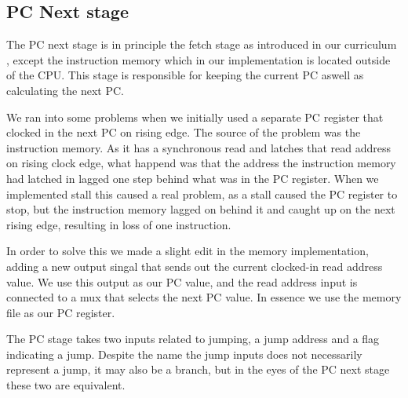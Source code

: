\subsection{PC Next stage}
The PC next stage is in principle the fetch stage as introduced in our curriculum 
\cite{curriculum}, except the instruction memory which in our implementation is located
outside of the CPU. This stage is responsible for keeping the current PC aswell as 
calculating the next PC.

We ran into some problems when we initially used a separate PC register that clocked 
in the next PC on rising edge. The source of the problem was the instruction memory.
As it has a synchronous read and latches that read address on rising clock edge,
what happend was that the address the instruction memory had latched in lagged one step
behind what was in the PC register. When we implemented
stall this caused a real problem, as a stall caused the PC register to stop, but the
instruction memory lagged on behind it and caught up on the next rising edge, resulting in loss of one instruction.

In order to solve this we made a slight edit in the memory implementation, adding a new output singal that sends out the current clocked-in read address value. 
We use this output as our PC value, and the read address input is connected to a mux
that selects the next PC value. In essence we use the memory file as our PC register.

The PC stage takes two inputs related to jumping, a jump address and a flag indicating
a jump. Despite the name the jump inputs does not necessarily represent a jump, it may
also be a branch, but in the eyes of the PC next stage these two are equivalent.

